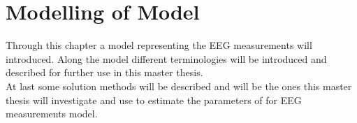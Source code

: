 \chapter{Modelling of Model}
Through this chapter a model representing the EEG measurements  will introduced. Along the model different terminologies will be introduced and described for further use in this master thesis.
\\
At last some solution methods will be described and will be the ones this master thesis will investigate and use to estimate the parameters of for EEG measurements model.
    

